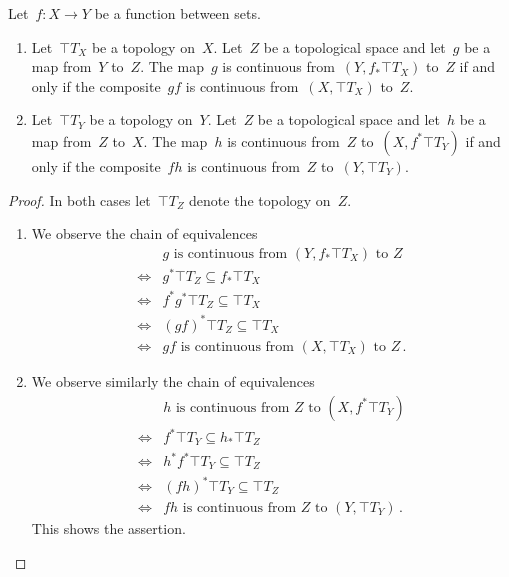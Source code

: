 \begin{corollary}
	Let~$f \colon X \to Y$ be a function between sets.
	\begin{enumerate}

		\item
			Let~$\top{T}_X$ be a topology on~$X$.
			Let~$Z$ be a topological space and let~$g$ be a map from~$Y$ to~$Z$.
			The map~$g$ is continuous from~$(Y, f_* \top{T}_X)$ to~$Z$ if and only if the composite~$g f$ is continuous from~$(X, \top{T}_X)$ to~$Z$.

		\item
			Let~$\top{T}_Y$ be a topology on~$Y$.
			Let~$Z$ be a topological space and let~$h$ be a map from~$Z$ to~$X$.
			The map~$h$ is continuous from~$Z$ to~$(X, f^* \top{T}_Y)$ if and only if the composite~$f h$ is continuous from~$Z$ to~$(Y, \top{T}_Y)$.

	\end{enumerate}
\end{corollary}

\begin{proof}
	In both cases let~$\top{T}_Z$ denote the topology on~$Z$.
	\begin{enumerate}

		\item
			We observe the chain of equivalences
			\begin{align*}
				{}&
				\text{$g$ is continuous from~$(Y, f_* \top{T}_X)$ to~$Z$} \\
				\iff{}&
				g^* \top{T}_Z ⊆ f_* \top{T}_X \\
				\iff{}&
				f^* g^* \top{T}_Z ⊆ \top{T}_X \\
				\iff{}&
				(g f)^* \top{T}_Z ⊆ \top{T}_X \\
				\iff{}&
				\text{$g f$ is continuous from~$(X, \top{T}_X)$ to~$Z$} \,.
			\end{align*}

		\item
			We observe similarly the chain of equivalences
			\begin{align*}
				{}&
				\text{$h$ is continuous from~$Z$ to~$(X, f^* \top{T}_Y)$} \\
				\iff{}&
				f^* \top{T}_Y ⊆ h_* \top{T}_Z \\
				\iff{}&
				h^* f^* \top{T}_Y ⊆ \top{T}_Z \\
				\iff{}&
				(f h)^* \top{T}_Y ⊆ \top{T}_Z \\
				\iff{}&
				\text{$f h$ is continuous from~$Z$ to~$(Y, \top{T}_Y)$} \,.
			\end{align*}
			This shows the assertion.
		\qedhere

	\end{enumerate}
\end{proof}
